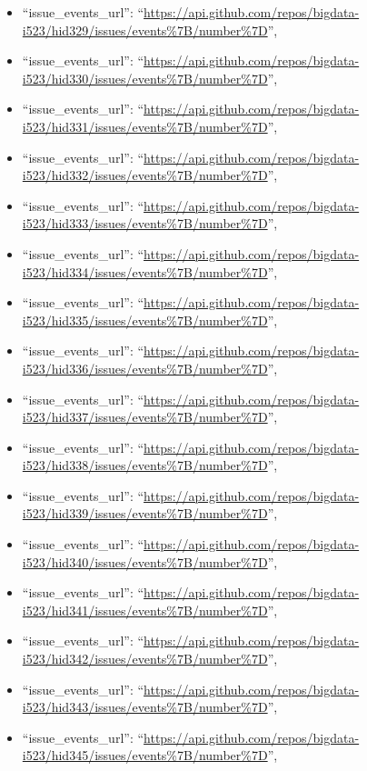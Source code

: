 \begin{itemize}
\item
  ``issue\_events\_url'':
  ``\url{https://api.github.com/repos/bigdata-i523/hid329/issues/events\%7B/number\%7D}'',
\item
  ``issue\_events\_url'':
  ``\url{https://api.github.com/repos/bigdata-i523/hid330/issues/events\%7B/number\%7D}'',
\item
  ``issue\_events\_url'':
  ``\url{https://api.github.com/repos/bigdata-i523/hid331/issues/events\%7B/number\%7D}'',
\item
  ``issue\_events\_url'':
  ``\url{https://api.github.com/repos/bigdata-i523/hid332/issues/events\%7B/number\%7D}'',
\item
  ``issue\_events\_url'':
  ``\url{https://api.github.com/repos/bigdata-i523/hid333/issues/events\%7B/number\%7D}'',
\item
  ``issue\_events\_url'':
  ``\url{https://api.github.com/repos/bigdata-i523/hid334/issues/events\%7B/number\%7D}'',
\item
  ``issue\_events\_url'':
  ``\url{https://api.github.com/repos/bigdata-i523/hid335/issues/events\%7B/number\%7D}'',
\item
  ``issue\_events\_url'':
  ``\url{https://api.github.com/repos/bigdata-i523/hid336/issues/events\%7B/number\%7D}'',
\item
  ``issue\_events\_url'':
  ``\url{https://api.github.com/repos/bigdata-i523/hid337/issues/events\%7B/number\%7D}'',
\item
  ``issue\_events\_url'':
  ``\url{https://api.github.com/repos/bigdata-i523/hid338/issues/events\%7B/number\%7D}'',
\item
  ``issue\_events\_url'':
  ``\url{https://api.github.com/repos/bigdata-i523/hid339/issues/events\%7B/number\%7D}'',
\item
  ``issue\_events\_url'':
  ``\url{https://api.github.com/repos/bigdata-i523/hid340/issues/events\%7B/number\%7D}'',
\item
  ``issue\_events\_url'':
  ``\url{https://api.github.com/repos/bigdata-i523/hid341/issues/events\%7B/number\%7D}'',
\item
  ``issue\_events\_url'':
  ``\url{https://api.github.com/repos/bigdata-i523/hid342/issues/events\%7B/number\%7D}'',
\item
  ``issue\_events\_url'':
  ``\url{https://api.github.com/repos/bigdata-i523/hid343/issues/events\%7B/number\%7D}'',
\item
  ``issue\_events\_url'':
  ``\url{https://api.github.com/repos/bigdata-i523/hid345/issues/events\%7B/number\%7D}'',

\end{itemize}
